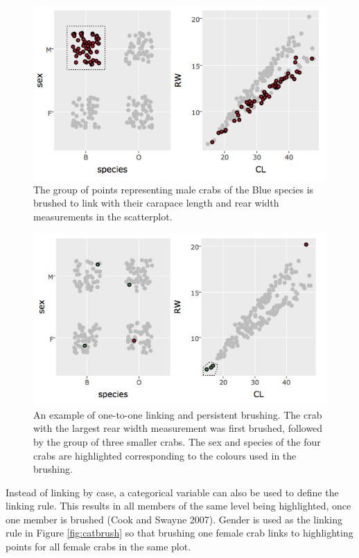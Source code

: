 \documentclass[]{book}
\theoremstyle{definition}
\theoremstyle{definition}
\theoremstyle{definition}
\theoremstyle{remark}
\begin{document}
\begin{figure}[center]
\includegraphics[width=700px]{files/one2one} \caption{The group of points representing male crabs of the Blue species is brushed to link with their carapace length and rear width measurements in the scatterplot.}\label{fig:one2one}
\end{figure}

\begin{figure}[center]
\includegraphics[width=700px]{files/one2one2} \caption{An example of one-to-one linking and persistent brushing. The crab with the largest rear width measurement was first brushed, followed by the group of three smaller crabs. The sex and species of the four crabs are highlighted corresponding to the colours used in the brushing.}\label{fig:one2one2}
\end{figure}

Instead of linking by case, a categorical variable can also be used to
define the linking rule. This results in all members of the same level
being highlighted, once one member is brushed (Cook and Swayne 2007).
Gender is used as the linking rule in Figure \ref{fig:catbrush} so that
brushing one female crab links to highlighting points for all female
crabs in the same plot.
\end{document}
